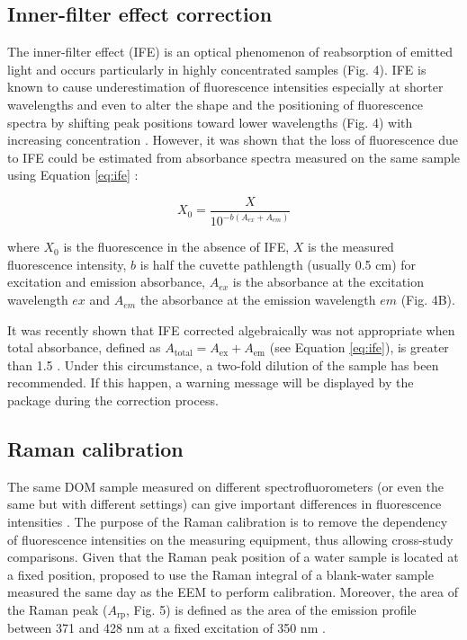 \documentclass[]{book}
\begin{document}
\subsection{Inner-filter effect
correction}\label{inner-filter-effect-correction}

The inner-filter effect (IFE) is an optical phenomenon of reabsorption
of emitted light and occurs particularly in highly concentrated samples
(Fig. 4). IFE is known to cause underestimation of fluorescence
intensities especially at shorter wavelengths and even to alter the
shape and the positioning of fluorescence spectra by shifting peak
positions toward lower wavelengths (Fig. 4) with increasing
concentration \citep{Mobed1996, Kothawala2013}. However, it was shown
that the loss of fluorescence due to IFE could be estimated from
absorbance spectra measured on the same sample using Equation
\ref{eq:ife} \citep{Ohno2002, Parker1957}:

\begin{equation}
X_0 = \frac{X}{10^{-b(A_{ex} + A_{em})}}
\label{eq:ife}
\end{equation}

where \(X_0\) is the fluorescence in the absence of IFE, \(X\) is the
measured fluorescence intensity, \(b\) is half the cuvette pathlength
(usually 0.5 cm) for excitation and emission absorbance, \(A_{ex}\) is
the absorbance at the excitation wavelength \(ex\) and \(A_{em}\) the
absorbance at the emission wavelength \(em\) (Fig. 4B).

It was recently shown that IFE corrected algebraically was not
appropriate when total absorbance, defined as
\(A_{\text{total}} = A_{\text{ex}} + A_{\text{em}}\) (see Equation
\ref{eq:ife}), is greater than 1.5 \citep{Kothawala2013}. Under this
circumstance, a two-fold dilution of the sample has been recommended. If
this happen, a warning message will be displayed by the package during
the correction process.

\subsection{Raman calibration}\label{raman-calibration}

The same DOM sample measured on different spectrofluorometers (or even
the same but with different settings) can give important differences in
fluorescence intensities \citep{Lawaetz2009, Coble1993}. The purpose of
the Raman calibration is to remove the dependency of fluorescence
intensities on the measuring equipment, thus allowing cross-study
comparisons. Given that the Raman peak position of a water sample is
located at a fixed position, \citep{Lawaetz2009} proposed to use the
Raman integral of a blank-water sample measured the same day as the EEM
to perform calibration. Moreover, the area of the Raman peak
(\(A_{\text{rp}}\), Fig. 5) is defined as the area of the emission
profile between 371 and 428 nm at a fixed excitation of 350 nm
\citep{Lawaetz2009}.
\end{document}
